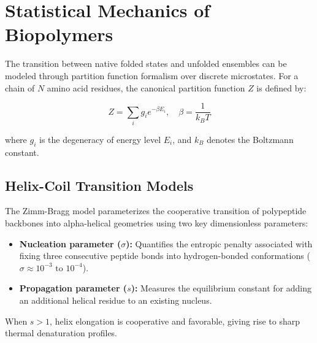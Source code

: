 \chapter{Statistical Mechanics of Biopolymers}
\label{ch:statistical_mechanics}

The transition between native folded states and unfolded ensembles can be modeled through partition function formalism over discrete microstates. For a chain of $N$ amino acid residues, the canonical partition function $Z$ is defined by:

\begin{equation}
  Z = \sum_{i} g_i e^{-\beta E_i}, \quad \beta = \frac{1}{k_B T}
  \label{eq:partition_func}
\end{equation}

where $g_i$ is the degeneracy of energy level $E_i$, and $k_B$ denotes the Boltzmann constant.

\section{Helix-Coil Transition Models}
The Zimm-Bragg model parameterizes the cooperative transition of polypeptide backbones into alpha-helical geometries using two key dimensionless parameters:
\begin{itemize}
  \item \textbf{Nucleation parameter ($\sigma$):} Quantifies the entropic penalty associated with fixing three consecutive peptide bonds into hydrogen-bonded conformations ($\sigma \approx 10^{-3} \text{ to } 10^{-4}$).
  \item \textbf{Propagation parameter ($s$):} Measures the equilibrium constant for adding an additional helical residue to an existing nucleus.
\end{itemize}

When $s > 1$, helix elongation is cooperative and favorable, giving rise to sharp thermal denaturation profiles.
